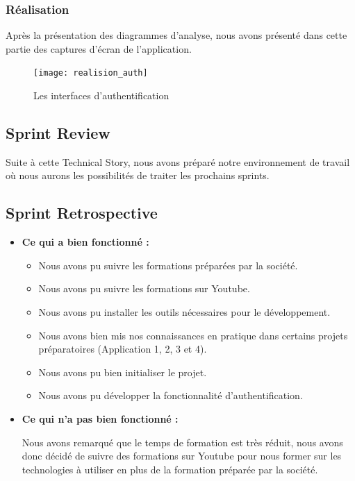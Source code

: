 \subsubsection{Réalisation}

Après la présentation des diagrammes d'analyse, nous avons présenté dans cette partie des captures d'écran de l'application.

\begin{figure}[H]
  \centering
  \texttt{[image: realision\_auth]}
  \caption{Les interfaces d'authentification}
  \label{fig:realision_auth}
\end{figure}

\subsection{Sprint Review}
Suite à cette Technical Story, nous avons préparé notre environnement de travail où nous aurons les possibilités de traiter les prochains sprints.

\subsection{Sprint Retrospective}

\begin{itemize}
  \item \textbf{Ce qui a bien fonctionné :}
  \begin{itemize}
    \item Nous avons pu suivre les formations préparées par la société.
    \item Nous avons pu suivre les formations sur Youtube.
    \item Nous avons pu installer les outils nécessaires pour le développement.
    \item Nous avons bien mis nos connaissances en pratique dans certains projets préparatoires (Application 1, 2, 3 et 4).
    \item Nous avons pu bien initialiser le projet.
    \item Nous avons pu développer la fonctionnalité d'authentification.
  \end{itemize}
  \item \textbf{Ce qui n'a pas bien fonctionné :}
  
  Nous avons remarqué que le temps de formation est très réduit, nous avons donc décidé de suivre des formations sur Youtube pour nous former sur les technologies à utiliser en plus de la formation préparée par la société.
\end{itemize}

